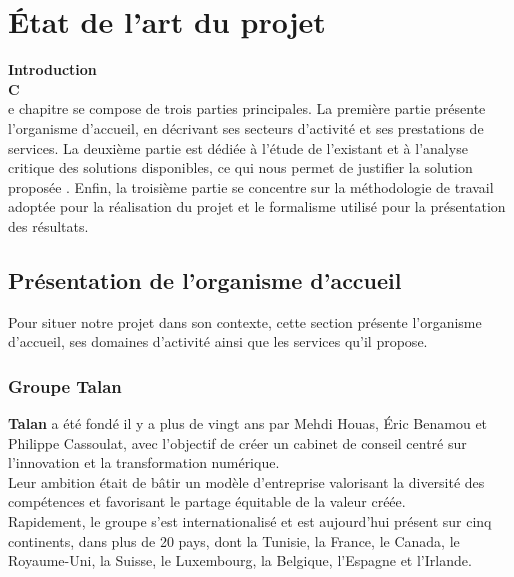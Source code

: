 \chapter{État de l’art du projet}
{\LARGE \bfseries Introduction\\[0.4cm] }
\noindent\lettrine[lines=2]{\textbf{C}}\\e chapitre se compose de trois parties principales. La première partie présente l’organisme d’accueil, en décrivant ses secteurs d’activité et ses prestations de services. La deuxième partie est dédiée à l’étude de l’existant et à l’analyse critique des solutions disponibles, ce qui nous permet de justifier la solution proposée . Enfin, la troisième partie se concentre sur la méthodologie de travail adoptée pour la réalisation du projet et le formalisme utilisé pour la présentation des résultats.

\section{Présentation de l’organisme d’accueil}
Pour situer notre projet dans son contexte, cette section présente l’organisme d’accueil, ses domaines d’activité ainsi que les services qu’il propose.

\subsection{Groupe Talan}
\textbf{Talan} a été fondé il y a plus de vingt ans par Mehdi Houas, Éric Benamou et Philippe Cassoulat, avec l’objectif de créer un cabinet de conseil centré sur l’innovation et la transformation numérique.
\vspace{0.4cm}\\
Leur ambition était de bâtir un modèle d’entreprise valorisant la diversité des compétences et favorisant le partage équitable de la valeur créée. \vspace{0.4cm}\\
Rapidement, le groupe s’est internationalisé et est aujourd’hui présent sur cinq continents, dans plus de 20 pays, dont la Tunisie, la France, le Canada, le Royaume-Uni, la Suisse, le Luxembourg, la Belgique, l’Espagne et l’Irlande.\\


